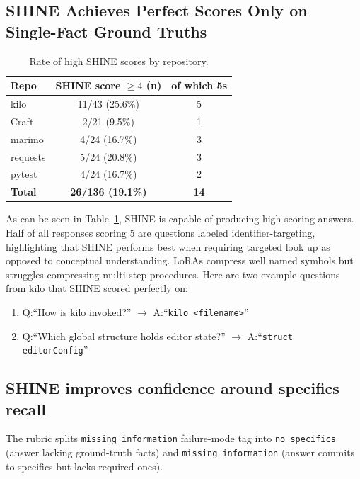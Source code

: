 \documentclass[conference,10.5pt]{IEEEtran}
\begin{document}
\subsection{SHINE Achieves Perfect Scores Only on Single-Fact Ground Truths}
 
\begin{table}[h]
\centering
\caption{Rate of high SHINE scores by repository.}
\label{tab:score-ceiling}
\begin{tabular}{lcc}
\toprule
\textbf{Repo} & \textbf{SHINE score $\geq 4$ (n)} & \textbf{of which 5s} \\
\midrule
kilo     & 11/43 (25.6\%) & 5 \\
Craft    & 2/21  (9.5\%)  & 1 \\
marimo   & 4/24  (16.7\%) & 3 \\
requests & 5/24  (20.8\%) & 3 \\
pytest   & 4/24  (16.7\%) & 2 \\
\midrule
\textbf{Total} & \textbf{26/136 (19.1\%)} & \textbf{14} \\
\bottomrule
\end{tabular}
\end{table}

As can be seen in Table~\ref{tab:score-ceiling}, SHINE is capable of producing high scoring answers. Half of all responses scoring 5 are questions labeled identifier-targeting, highlighting that SHINE performs best when requiring targeted look up as opposed to conceptual understanding. LoRAs compress well named symbols but struggles compressing multi-step procedures. Here are two example questions from kilo that SHINE scored perfectly on:
\begin{enumerate}
    \item Q:``How is kilo invoked?'' $\rightarrow$ A:``\texttt{kilo <filename>}''
    \item Q:``Which global structure holds editor state?'' $\rightarrow$ A:``\texttt{struct editorConfig}''
\end{enumerate}

\subsection{SHINE improves confidence around specifics recall}
The rubric splits \texttt{missing\_information} failure-mode tag into \texttt{no\_specifics} (answer lacking ground-truth facts) and \texttt{missing\_information} (answer commits to specifics but lacks required ones).
\end{document}
